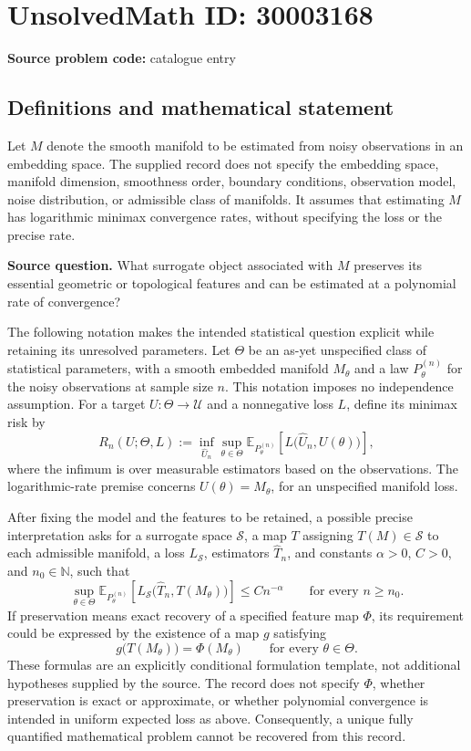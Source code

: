 \documentclass[11pt]{article}
\newcommand{\N}{\mathbb{N}}
\newcommand{\E}{\mathbb{E}}
\begin{document}
\section*{UnsolvedMath ID: 30003168}
\textbf{Source problem code:} catalogue entry
\subsection{Definitions and mathematical statement}
Let \(M\) denote the smooth manifold to be estimated from noisy observations in an embedding space. The supplied record does not specify the embedding space, manifold dimension, smoothness order, boundary conditions, observation model, noise distribution, or admissible class of manifolds. It assumes that estimating \(M\) has logarithmic minimax convergence rates, without specifying the loss or the precise rate.

\textbf{Source question.} What surrogate object associated with \(M\) preserves its essential geometric or topological features and can be estimated at a polynomial rate of convergence?

The following notation makes the intended statistical question explicit while retaining its unresolved parameters. Let \(\Theta\) be an as-yet unspecified class of statistical parameters, with a smooth embedded manifold \(M_\theta\) and a law \(P_\theta^{(n)}\) for the noisy observations at sample size \(n\). This notation imposes no independence assumption. For a target \(U:\Theta\to\mathcal U\) and a nonnegative loss \(L\), define its minimax risk by
\[
 R_n(U;\Theta,L)
 :=\inf_{\widehat U_n}\sup_{\theta\in\Theta}
 \E_{P_\theta^{(n)}}\!\left[L\bigl(\widehat U_n,U(\theta)\bigr)\right],
\]
where the infimum is over measurable estimators based on the observations. The logarithmic-rate premise concerns \(U(\theta)=M_\theta\), for an unspecified manifold loss.

After fixing the model and the features to be retained, a possible precise interpretation asks for a surrogate space \(\mathcal S\), a map \(T\) assigning \(T(M)\in\mathcal S\) to each admissible manifold, a loss \(L_{\mathcal S}\), estimators \(\widehat T_n\), and constants \(\alpha>0\), \(C>0\), and \(n_0\in\N\), such that
\[
 \sup_{\theta\in\Theta}
 \E_{P_\theta^{(n)}}\!\left[
 L_{\mathcal S}\bigl(\widehat T_n,T(M_\theta)\bigr)
 \right]
 \le C n^{-\alpha}
 \qquad\text{for every }n\ge n_0.
\]
If preservation means exact recovery of a specified feature map \(\Phi\), its requirement could be expressed by the existence of a map \(g\) satisfying
\[
 g\bigl(T(M_\theta)\bigr)=\Phi(M_\theta)
 \qquad\text{for every }\theta\in\Theta.
\]
These formulas are an explicitly conditional formulation template, not additional hypotheses supplied by the source. The record does not specify \(\Phi\), whether preservation is exact or approximate, or whether polynomial convergence is intended in uniform expected loss as above. Consequently, a unique fully quantified mathematical problem cannot be recovered from this record.
\end{document}
